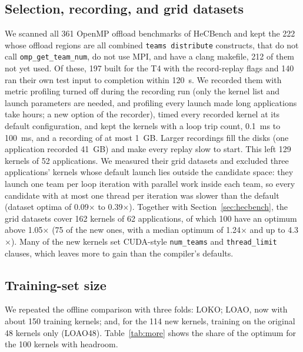 \documentclass[10pt]{article}
\newcommand{\x}{\ensuremath{\times}}
\newcommand{\code}[1]{\texttt{#1}}
\begin{document}
\subsection{Selection, recording, and grid datasets}
We scanned all 361 OpenMP offload benchmarks of HeCBench and kept the 222 whose
offload regions are all combined \code{teams distribute} constructs, that do
not call \code{omp\_get\_team\_num}, do not use MPI, and have a clang makefile,
212 of them not yet used. Of these, 197 built for the T4 with the
record-replay flags and 140 ran their own test input to completion within
120~s. We recorded them with metric profiling turned off during the recording
run (only the kernel list and launch parameters are needed, and profiling every
launch made long applications take hours; a new option of the recorder), timed
every recorded kernel at its default configuration, and kept the kernels with a
loop trip count, 0.1~ms to 100~ms, and a recording of at most 1~GB. Larger
recordings fill the disks (one application recorded 41~GB) and make every
replay slow to start. This left 129 kernels of 52 applications. We measured
their grid datasets and excluded three applications' kernels whose default launch
lies outside the candidate space: they launch one team per loop iteration with
parallel work inside each team, so every candidate with at most one thread per
iteration was slower than the default (dataset optima of 0.09\x{} to 0.39\x{}).
Together with Section~\ref{sec:hecbench}, the grid datasets cover 162 kernels of 62
applications, of which 100 have an optimum above 1.05\x{} (75 of the new ones,
with a median optimum of 1.24\x{} and up to 4.3\x{}). Many of the new kernels set
CUDA-style \code{num\_teams} and \code{thread\_limit} clauses, which leaves more
to gain than the compiler's defaults.

\subsection{Training-set size}
We repeated the offline comparison with three folds: LOKO; LOAO, now with about
150 training kernels; and, for the 114 new kernels, training on the original 48
kernels only (LOAO48). Table~\ref{tab:more} shows the share of the optimum for
the 100 kernels with headroom.
\end{document}
